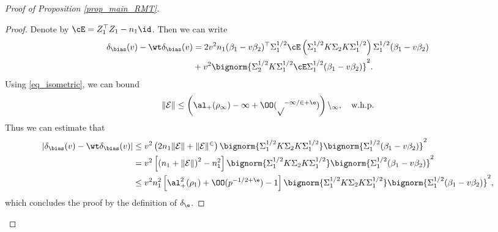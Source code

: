 \documentclass[aos,preprint]{imsart}
\begin{document}
\begin{proof}[Proof of Proposition \ref{prop_main_RMT}]
{\begin{proof}
	Denote by $\cE = Z_1^{\top}Z_1 - {n_1}\id$. Then we can write
	\begin{align}
		 \delta_{\bias}(v)-\wt\delta_{\bias}(v)&= {2v^2n_1}(\beta_1 - v\beta_2)^{\top}\Sigma_1^{1/2} \cE\left(\Sigma_1^{1/2}K \Sigma_2 K \Sigma_1^{1/2}\right) \Sigma_1^{1/2} (\beta_1 - v\beta_2) \nonumber
		\\
		&+ v^2\bignorm{\Sigma_2^{1/2} K \Sigma_1^{1/2}\cE \Sigma_1^{1/2}(\beta_1 - v\beta_2)}^2. \label{eq_lem_model_shift_1}
	\end{align}
	Using \eqref{eq_isometric}, we can bound  
	$$\|\cal E\|\le \left( \al_+(\rho_1)-1 + \OO(p^{-1/2+\e})\right)n_1, \quad \text{w.h.p.}$$
	Thus we can estimate that 
	\begin{align*}
	| \delta_{\bias}(v)-\wt\delta_{\bias}(v)|&\le v^2 \left( 2n_1  \|\cal E\| +  \|\cal E\|^2 \right) \bignorm{\Sigma_1^{1/2} K \Sigma_2 K \Sigma_1^{1/2}} \bignorm{\Sigma_1^{1/2} (\beta_1 - v\beta_2)}^2 \\
	&=  v^2 \left[\left( n_1 + \|\cal E\|\right)^2 -n_1^2 \right] \bignorm{\Sigma_1^{1/2} K \Sigma_2 K \Sigma_1^{1/2}} \bignorm{\Sigma_1^{1/2} (\beta_1 - v\beta_2)}^2 \\
	& \le v^2 n_1^2 \left[ \al_+^2(\rho_1) + \OO(p^{-1/2+\e}) -1\right]\bignorm{\Sigma_1^{1/2} K \Sigma_2 K \Sigma_1^{1/2}} \bignorm{\Sigma_1^{1/2} (\beta_1 - v\beta_2)}^2,
	\end{align*}
	which concludes the proof by the definition of $\delta_\e$.	

\end{proof}}
\end{proof}
\end{document}
